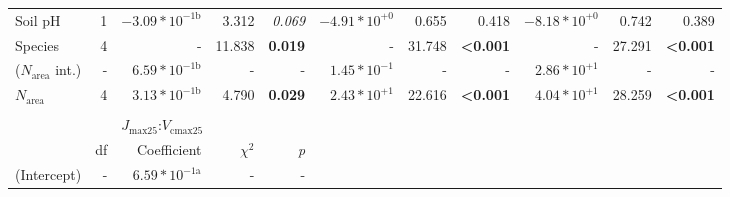 \begin{landscape}
\begin{table}
{\begin{tabular}{p{2.5cm}p{0.5cm}p{2cm}p{1.5cm}p{1.5cm}p{2cm}p{1.5cm}p{1.5cm}p{2cm}p{1.5cm}p{1.5cm}}
            Soil pH & \multicolumn{1}{r}{1}
            & \multicolumn{1}{r}{$-3.09*10^{-1\mathrm{b}}$} & \multicolumn{1}{r}{3.312} & \multicolumn{1}{r}{\textit{0.069}}
            & \multicolumn{1}{r}{$-4.91*10^{+0}$}                    & \multicolumn{1}{r}{0.655} & \multicolumn{1}{r}{0.418}
            & \multicolumn{1}{r}{$-8.18*10^{+0}$}                    & \multicolumn{1}{r}{0.742} & \multicolumn{1}{r}{0.389} 
            \\

            Species & \multicolumn{1}{r}{4}
            & \multicolumn{1}{r}{-} & \multicolumn{1}{r}{11.838} & \multicolumn{1}{r}{\textbf{0.019}}
            & \multicolumn{1}{r}{-} & \multicolumn{1}{r}{31.748} & \multicolumn{1}{r}{\textbf{\textless{}0.001}}
            & \multicolumn{1}{r}{-} & \multicolumn{1}{r}{27.291} & \multicolumn{1}{r}{\textbf{\textless{}0.001}}
            \\
            \hline

            ($N_\mathrm{area}$ int.) & \multicolumn{1}{r}{-}
            & \multicolumn{1}{r}{$6.59*10^{-1\mathrm{b}}$} & \multicolumn{1}{r}{-} & \multicolumn{1}{r}{-}
            & \multicolumn{1}{r}{$1.45*10^{-1}$}                    & \multicolumn{1}{r}{-} & \multicolumn{1}{r}{-}
            & \multicolumn{1}{r}{$2.86*10^{+1}$}                    & \multicolumn{1}{r}{-} & \multicolumn{1}{r}{-}
            \\

            $N_\mathrm{area}$ & \multicolumn{1}{r}{4}
            & \multicolumn{1}{r}{$3.13*10^{-1\mathrm{b}}$} & \multicolumn{1}{r}{4.790} & \multicolumn{1}{r}{\textbf{0.029}}
            & \multicolumn{1}{r}{$2.43*10^{+1}$}                    & \multicolumn{1}{r}{22.616} & \multicolumn{1}{r}{\textbf{\textless{}0.001}}
            & \multicolumn{1}{r}{$4.04*10^{+1}$}                    & \multicolumn{1}{r}{28.259} & \multicolumn{1}{r}{\textbf{\textless{}0.001}}
            \\
            \hline
            &&&&&&&&&&
            \\

            && \multicolumn{3}{l}{$J_\mathrm{max25}$:$V_\mathrm{cmax25}$} &&&&& \\
            \hline
            & \multicolumn{1}{r}{df}
            & \multicolumn{1}{r}{Coefficient} & \multicolumn{1}{r}{$\chi^{2}$} & \multicolumn{1}{r}{\textit{p}} 
            \\
            \hline

            (Intercept) & \multicolumn{1}{r}{-}
            & \multicolumn{1}{r}{$6.59*10^{-1\mathrm{a}}$} & \multicolumn{1}{r}{-} & \multicolumn{1}{r}{-}
            &&&&&&
            \\


\end{tabular}}
\end{table}
\end{landscape}
